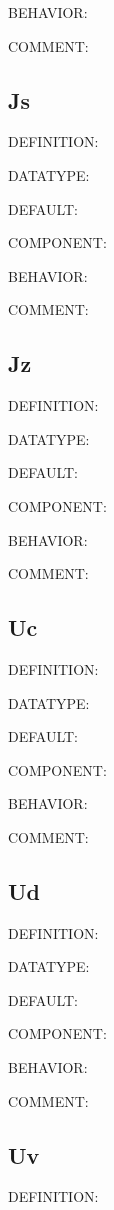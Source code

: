 {\color{purple}BEHAVIOR:}

{\color{olive}COMMENT:}

\subsection{Js}
{\color{red}DEFINITION:}

{\color{green}DATATYPE:}

{\color{blue}DEFAULT:}

{\color{brown}COMPONENT:}

{\color{purple}BEHAVIOR:}

{\color{olive}COMMENT:}

\subsection{Jz}
{\color{red}DEFINITION:}

{\color{green}DATATYPE:}

{\color{blue}DEFAULT:}

{\color{brown}COMPONENT:}

{\color{purple}BEHAVIOR:}

{\color{olive}COMMENT:}

\subsection{Uc}
{\color{red}DEFINITION:}

{\color{green}DATATYPE:}

{\color{blue}DEFAULT:}

{\color{brown}COMPONENT:}

{\color{purple}BEHAVIOR:}

{\color{olive}COMMENT:}

\subsection{Ud}
{\color{red}DEFINITION:}

{\color{green}DATATYPE:}

{\color{blue}DEFAULT:}

{\color{brown}COMPONENT:}

{\color{purple}BEHAVIOR:}

{\color{olive}COMMENT:}

\subsection{Uv}
{\color{red}DEFINITION:}


